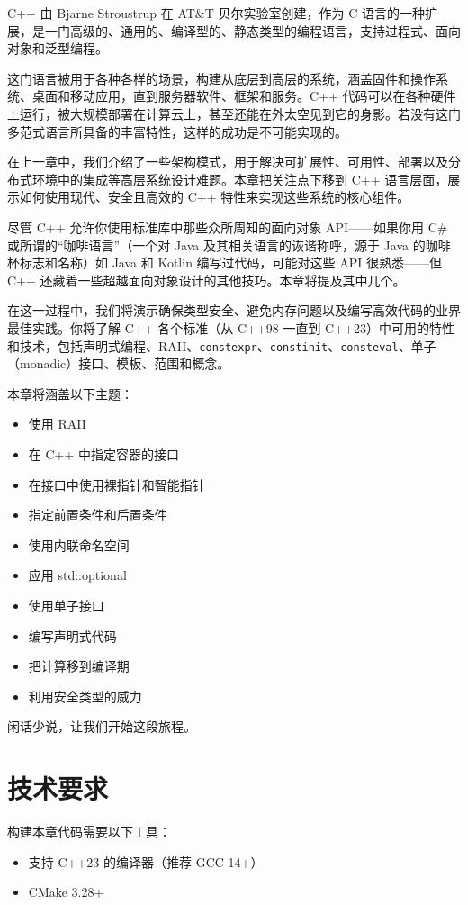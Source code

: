 C++ 由 Bjarne Stroustrup 在 AT\&T 贝尔实验室创建，作为 C 语言的一种扩展，是一门高级的、通用的、编译型的、静态类型的编程语言，支持过程式、面向对象和泛型编程。

这门语言被用于各种各样的场景，构建从底层到高层的系统，涵盖固件和操作系统、桌面和移动应用，直到服务器软件、框架和服务。C++ 代码可以在各种硬件上运行，被大规模部署在计算云上，甚至还能在外太空见到它的身影。若没有这门多范式语言所具备的丰富特性，这样的成功是不可能实现的。

在上一章中，我们介绍了一些架构模式，用于解决可扩展性、可用性、部署以及分布式环境中的集成等高层系统设计难题。本章把关注点下移到 C++ 语言层面，展示如何使用现代、安全且高效的 C++ 特性来实现这些系统的核心组件。

尽管 C++ 允许你使用标准库中那些众所周知的面向对象 API——如果你用 C\# 或所谓的“咖啡语言”（一个对 Java 及其相关语言的诙谐称呼，源于 Java 的咖啡杯标志和名称）如 Java 和 Kotlin 编写过代码，可能对这些 API 很熟悉——但 C++ 还藏着一些超越面向对象设计的其他技巧。本章将提及其中几个。

在这一过程中，我们将演示确保类型安全、避免内存问题以及编写高效代码的业界最佳实践。你将了解 C++ 各个标准（从 C++98 一直到 C++23）中可用的特性和技术，包括声明式编程、RAII、\texttt{constexpr}、\texttt{constinit}、\texttt{consteval}、单子（monadic）接口、模板、范围和概念。

本章将涵盖以下主题：

\begin{itemize}
\item 使用 RAII
\item 在 C++ 中指定容器的接口
\item 在接口中使用裸指针和智能指针
\item 指定前置条件和后置条件
\item 使用内联命名空间
\item 应用 std::optional
\item 使用单子接口
\item 编写声明式代码
\item 把计算移到编译期
\item 利用安全类型的威力
\end{itemize}

闲话少说，让我们开始这段旅程。

\section{技术要求}

构建本章代码需要以下工具：

\begin{itemize}
\item 支持 C++23 的编译器（推荐 GCC 14+）
\item CMake 3.28+
\end{itemize}

